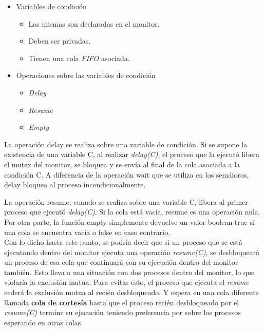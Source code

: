 \begin{itemize}
    \item Variables de condición
    \begin{itemize}
        \item Las mismas son declaradas en el monitor. 
        \item Deben ser privadas. 
        \item Tienen una cola \textit{FIFO} asociada.
    \end{itemize}
    \item Operaciones sobre las variables de condición
    \begin{itemize}
        \item \textit{Delay}
        \item \textit{Resume}
        \item \textit{Empty}
    \end{itemize}
\end{itemize}

La operación delay se realiza sobre una variable de condición. Si se supone la existencia de una variable C, al realizar \textit{delay(C)}, el proceso que la ejecutó libera el mutex del monitor, se bloquea y se envía al final de la cola asociada a la condición C. A diferencia de la operación wait que se utiliza en los semáforos, delay bloquea al proceso incondicionalmente.\\

\par La operación resume, cuando se realiza sobre una variable C, libera al primer proceso que ejecutó \textit{delay(C)}. Si la cola está vacía, resume es una operación nula. Por otra parte, la función empty simplemente devuelve un valor boolean true si una cola se encuentra vacía o false en caso contrario.\\

Con lo dicho hasta este punto, se podría decir que si un proceso que se está ejecutando dentro del monitor ejecuta una operación \textit{resume(C)}, se desbloqueará un proceso de esa cola que continuará con su ejecución dentro del monitor también. Esto lleva a una situación con dos procesos dentro del monitor, lo que violaría la exclusión mutua. Para evitar esto, el proceso que ejecuta el \textit{resume} cederá la exclusión mutua al recién desbloqueado. Y espera en una cola diferente llamada \textbf{cola de cortesía} hasta que el proceso recién desbloqueado por el \textit{resume(C)} termine su ejecución teniendo preferencia por sobre los procesos esperando en otras colas.

